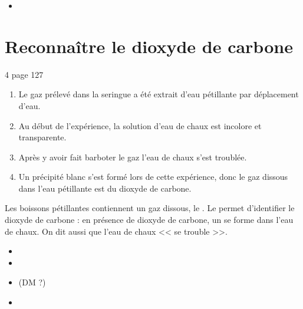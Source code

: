 \documentclass[12pt,a4paper]{article}
\begin{document}
\begin{myexos}
	\begin{multicols}{2}
		
		\begin{itemize}
			\item {}
		\end{itemize}
		
	\end{multicols}
\end{myexos}

\section{Reconnaître le dioxyde de carbone}

\begin{myact}{4 page 127}
	\begin{enumerate}
		\item Le gaz prélevé dans la seringue a été extrait d'eau pétillante par déplacement d'eau.
		\item Au début de l'expérience, la solution d'eau de chaux est incolore et transparente.
		\item Après y avoir fait barboter le gaz l'eau de chaux s'est troublée.
		\item Un précipité blanc s'est formé lors de cette expérience, donc le gaz dissous dans l'eau pétillante est du dioxyde de carbone.
	\end{enumerate}
\end{myact}

\begin{mybilan}
	Les boissons pétillantes contiennent un gaz dissous, le .
	Le  permet d'identifier le dioxyde de carbone : en présence de dioxyde de carbone, un  se forme dans l'eau de chaux. On dit aussi que l'eau de chaux << se trouble >>.
\end{mybilan}

\begin{myexos}
	\begin{multicols}{2}
		
		\begin{itemize}
			\item {}
			\item {}
			\item {} (DM ?)
			\item {}
		\end{itemize}
		
	\end{multicols}
\end{myexos}
\end{document}
